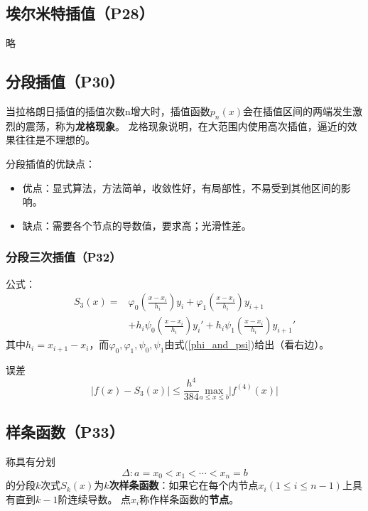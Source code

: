 \documentclass[fontset=ubuntu]{ctexart}
\numberwithin{equation}{section}
\numberwithin{theorem}{section}
\begin{document}
\begin{multicols}{2}
    \subsection{埃尔米特插值（P28）}

    略

    \subsection{分段插值（P30）}

    当拉格朗日插值的插值次数n增大时，插值函数$p_n(x)$会在插值区间的两端发生激烈的震荡，称为\textbf{龙格现象}。
    龙格现象说明，在大范围内使用高次插值，逼近的效果往往是不理想的。

    分段插值的优缺点：

    \begin{itemize}
        \item 优点：显式算法，方法简单，收敛性好，有局部性，不易受到其他区间的影响。
        \item 缺点：需要各个节点的导数值，要求高；光滑性差。
    \end{itemize}

    \subsubsection{分段三次插值（P32）}

    公式：
    \begin{align}
        S_3(x)=&\varphi_0\left(\frac{x-x_i}{h_i} \right ) y_i+\varphi_1\left(\frac{x-x_i}{h_i} \right )y_{i+1}\nonumber \\
        &+h_i\psi _0\left(\frac{x-x_i}{h_i} \right )y_i'+h_i\psi_1\left(\frac{x-x_i}{h_i} \right )y_{i+1}'
    \end{align}
    其中$h_i=x_{i+1}-x_i$，而$\varphi_0,\varphi_1,\psi_0,\psi_1$由式(\ref{phi_and_psi})给出（看右边）。

    误差
    \begin{equation}
        \lvert f(x)-S_3(x)\rvert \leq \frac{h^4}{384}\underset{a\leq x\leq b}{\text{max}}\lvert f^{(4)}(x)\rvert
    \end{equation}

    \subsection{样条函数（P33）}

    称具有分划
    \begin{equation*}
        \varDelta:a=x_0<x_1<\cdots<x_n=b
    \end{equation*}
    的分段$k$次式$S_k(x)$为\textbf{$k$次样条函数}：如果它在每个内节点$x_i(1\leq i\leq n-1)$上具有直到$k-1$阶连续导数。
    点$x_i$称作样条函数的\textbf{节点}。


\end{multicols}
\end{document}
